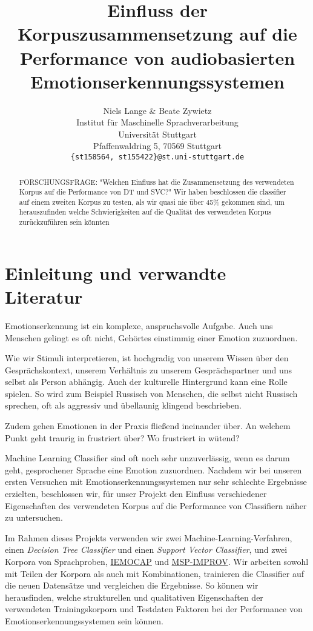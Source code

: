 \documentclass{article} %
\title{Einfluss der Korpuszusammensetzung auf die Performance von audiobasierten Emotionserkennungssystemen}
\author{Niels Lange \& Beate Zywietz\\
Institut für Maschinelle Sprachverarbeitung\\
Universität Stuttgart\\
Pfaffenwaldring 5, 70569 Stuttgart \\
\texttt{\{st158564, st155422\}@st.uni-stuttgart.de} \\
}
\begin{document}
\maketitle
\begin{abstract}

FORSCHUNGSFRAGE: "Welchen Einfluss hat die Zusammensetzung des verwendeten Korpus auf die Performance von DT und SVC?"
Wir haben beschlossen die classifier auf einem zweiten Korpus zu testen, als wir quasi nie über 45\% gekommen sind, um herauszufinden welche Schwierigkeiten auf die Qualität des verwendeten Korpus zurückzuführen sein könnten
\end{abstract}

\section{Einleitung und verwandte Literatur}
Emotionserkennung ist ein komplexe, anspruchsvolle Aufgabe. Auch uns Menschen gelingt es oft nicht, Gehörtes einstimmig einer Emotion zuzuordnen. 

Wie wir Stimuli interpretieren, ist hochgradig von unserem Wissen über den Gesprächskontext, unserem Verhältnis zu unserem Gesprächspartner und uns selbst als Person abhängig. Auch der kulturelle Hintergrund kann eine Rolle spielen. So wird zum Beispiel Russisch von Menschen, die selbst nicht Russisch sprechen, oft als aggressiv und übellaunig klingend beschrieben. 

Zudem gehen Emotionen in der Praxis fließend ineinander über. An welchem Punkt geht traurig in frustriert über? Wo frustriert in wütend? 

Machine Learning Classifier sind oft noch sehr unzuverlässig, wenn es darum geht, gesprochener Sprache eine Emotion zuzuordnen. Nachdem wir bei unseren ersten Versuchen mit Emotionserkennungssystemen nur sehr schlechte Ergebnisse erzielten, beschlossen wir, für unser Projekt den Einfluss verschiedener Eigenschaften des verwendeten Korpus auf die Performance von Classifiern näher zu untersuchen. 

Im Rahmen dieses Projekts verwenden wir zwei Machine-Learning-Verfahren, einen \emph{Decision Tree Classifier} und einen \emph{Support Vector Classifier}, und zwei Korpora von Sprachproben, \href{https://link.springer.com/content/pdf/10.1007/s10579-008-9076-6.pdf}{IEMOCAP} und \href{https://ieeexplore.ieee.org/stamp/stamp.jsp?arnumber=7374697}{MSP-IMPROV}. Wir arbeiten sowohl mit Teilen der Korpora als auch mit Kombinationen, trainieren die Classifier auf die neuen Datensätze und vergleichen die Ergebnisse. So können wir herausfinden, welche strukturellen und qualitativen Eigenschaften der verwendeten Trainingskorpora und Testdaten Faktoren bei der Performance von Emotionserkennungssystemen sein können. 
\end{document}
